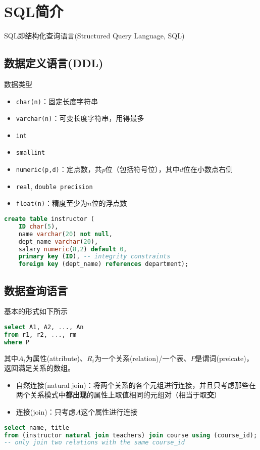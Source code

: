 
\section{SQL简介} %
SQL即结构化查询语言(Structured Query Language, SQL)

\subsection{数据定义语言(DDL)}
数据类型
\begin{itemize}
	\item \verb'char(n)'：固定长度字符串
	\item \verb'varchar(n)'：可变长度字符串，用得最多
	\item \verb'int'
	\item \verb'smallint'
	\item \verb'numeric(p,d)'：定点数，共$p$位（包括符号位），其中$d$位在小数点右侧
	\item \verb'real', \verb'double precision'
	\item \verb'float(n)'：精度至少为$n$位的浮点数
\end{itemize}
\begin{lstlisting}[language=sql]
create table instructor (
	ID char(5),
	name varchar(20) not null,
	dept_name varchar(20),
	salary numeric(8,2) default 0,
	primary key (ID), -- integrity constraints
	foreign key (dept_name) references department);
\end{lstlisting}

\subsection{数据查询语言}
基本的形式如下所示
\begin{lstlisting}[language=sql]
select A1, A2, ..., An
from r1, r2, ..., rm
where P
\end{lstlisting}
其中$A_i$为属性(attribute)、$R_i$为一个关系(relation)/一个表、$P$是谓词(preicate)，返回满足关系的数组。

\begin{itemize}
	\item 自然连接(natural join)：将两个关系的各个元组进行连接，并且只考虑那些在两个关系模式中\textbf{都出现}的属性上取值相同的元组对（相当于取\textbf{交}）
	\item 连接(join)：只考虑$A$这个属性进行连接
\end{itemize}
\begin{lstlisting}[language=sql]
select name, title
from (instructor natural join teachers) join course using (course_id);
-- only join two relations with the same course_id
\end{lstlisting}

